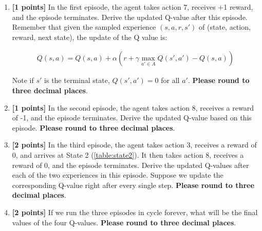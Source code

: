 \documentclass[11pt]{article}
\numberwithin{equation}{section} %
\numberwithin{figure}{section} %
\numberwithin{table}{section} %
\begin{document}
\begin{enumerate}
\item \textbf{[1 points]} In the first episode, the agent takes action 7, receives +1 reward, and the episode terminates. Derive the updated Q-value after this episode. Remember that given the sampled experience $(s, a, r, s')$ of (state, action, reward, next state), the update of the Q value is:

\begin{align}
Q(s, a) = Q(s, a) + \alpha \left(r + \gamma \max_{a' \in A}Q(s', a') - Q(s,a) \right)
\end{align}

Note if $s'$ is the terminal state, $Q(s', a') = 0$ for all $a'$.  \textbf{Please round to three decimal places}.

\begin{tcolorbox}[fit,height=1cm, width=\linewidth, blank, borderline={1pt}{-2pt},nobeforeafter]
\end{tcolorbox}


\item \textbf{[1 points]} In the second episode, the agent takes action 8, receives a reward of -1, and the episode terminates. Derive the updated Q-value based on this episode.  \textbf{Please round to three decimal places}.

\begin{tcolorbox}[fit,height=1cm, width=\linewidth, blank, borderline={1pt}{-2pt},nobeforeafter]
\end{tcolorbox}


\item \textbf{[2 points]} In the third episode, the agent takes action 3, receives a reward of 0, and arrives at State 2 (\ref{table:state2}). It then takes action 8, receives a reward of 0, and the episode terminates. Derive the updated Q-values after each of the two experiences in this episode. Suppose we update the corresponding Q-value right after every single step.
 \textbf{Please round to three decimal places}.

\begin{tcolorbox}[fit,height=3cm, width=\linewidth, blank, borderline={1pt}{-2pt},nobeforeafter]
\end{tcolorbox}


\item \textbf{[2 points]} If we run the three episodes in cycle forever, what will be the final values of the four Q-values.  \textbf{Please round to three decimal places}.


\end{enumerate}
\end{document}
